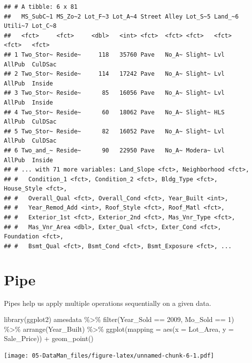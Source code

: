 \documentclass[
]{book}
\newenvironment{Shaded}{\begin{snugshade}}{\end{snugshade}}
\newcommand{\AttributeTok}[1]{\textcolor[rgb]{0.77,0.63,0.00}{#1}}
\newcommand{\DecValTok}[1]{\textcolor[rgb]{0.00,0.00,0.81}{#1}}
\newcommand{\FunctionTok}[1]{\textcolor[rgb]{0.00,0.00,0.00}{#1}}
\newcommand{\NormalTok}[1]{#1}
\newcommand{\SpecialCharTok}[1]{\textcolor[rgb]{0.00,0.00,0.00}{#1}}
\theoremstyle{definition}
\theoremstyle{definition}
\theoremstyle{definition}
\theoremstyle{definition}
\theoremstyle{remark}
\begin{document}
\begin{verbatim}
## # A tibble: 6 x 81
##   MS_SubC~1 MS_Zo~2 Lot_F~3 Lot_A~4 Street Alley Lot_S~5 Land_~6 Utili~7 Lot_C~8
##   <fct>     <fct>     <dbl>   <int> <fct>  <fct> <fct>   <fct>   <fct>   <fct>  
## 1 Two_Stor~ Reside~     118   35760 Pave   No_A~ Slight~ Lvl     AllPub  CulDSac
## 2 Two_Stor~ Reside~     114   17242 Pave   No_A~ Slight~ Lvl     AllPub  Inside 
## 3 Two_Stor~ Reside~      85   16056 Pave   No_A~ Slight~ Lvl     AllPub  Inside 
## 4 Two_Stor~ Reside~      60   18062 Pave   No_A~ Slight~ HLS     AllPub  CulDSac
## 5 Two_Stor~ Reside~      82   16052 Pave   No_A~ Slight~ Lvl     AllPub  CulDSac
## 6 Two_and_~ Reside~      90   22950 Pave   No_A~ Modera~ Lvl     AllPub  Inside 
## # ... with 71 more variables: Land_Slope <fct>, Neighborhood <fct>,
## #   Condition_1 <fct>, Condition_2 <fct>, Bldg_Type <fct>, House_Style <fct>,
## #   Overall_Qual <fct>, Overall_Cond <fct>, Year_Built <int>,
## #   Year_Remod_Add <int>, Roof_Style <fct>, Roof_Matl <fct>,
## #   Exterior_1st <fct>, Exterior_2nd <fct>, Mas_Vnr_Type <fct>,
## #   Mas_Vnr_Area <dbl>, Exter_Qual <fct>, Exter_Cond <fct>, Foundation <fct>,
## #   Bsmt_Qual <fct>, Bsmt_Cond <fct>, Bsmt_Exposure <fct>, ...
\end{verbatim}

\hypertarget{pipe}{%
\section{Pipe}\label{pipe}}

Pipes help us apply multiple operations sequentially on a given data.

\begin{Shaded}
\begin{Highlighting}[]
\FunctionTok{library}\NormalTok{(ggplot2)}
\NormalTok{amesdata }\SpecialCharTok{\%\textgreater{}\%} 
  \FunctionTok{filter}\NormalTok{(Year\_Sold }\SpecialCharTok{==} \DecValTok{2009}\NormalTok{, Mo\_Sold }\SpecialCharTok{==} \DecValTok{1}\NormalTok{) }\SpecialCharTok{\%\textgreater{}\%} 
  \FunctionTok{arrange}\NormalTok{(Year\_Built) }\SpecialCharTok{\%\textgreater{}\%}
  \FunctionTok{ggplot}\NormalTok{(}\AttributeTok{mapping =} \FunctionTok{aes}\NormalTok{(}\AttributeTok{x =}\NormalTok{ Lot\_Area, }\AttributeTok{y =}\NormalTok{ Sale\_Price)) }\SpecialCharTok{+} 
  \FunctionTok{geom\_point}\NormalTok{()}
\end{Highlighting}
\end{Shaded}

\texttt{[image: 05-DataMan\_files/figure-latex/unnamed-chunk-6-1.pdf]}
\end{document}
